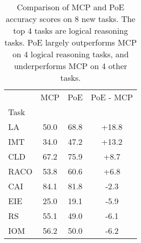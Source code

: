 \begin{table}[h]
\centering
\caption{Comparison of MCP and PoE accuracy scores on 8 new tasks. The top 4 tasks are logical reasoning tasks. PoE largely outperforms MCP on 4 logical reasoning tasks, and underperforms MCP on 4 other tasks.}
\label{tab:logical_reasoning}
\begin{tabular}{l|c|c|c}
 & MCP & PoE & PoE - MCP \\
Task &  &  &  \\
LA & 50.0 & 68.8 & +18.8 \\
IMT & 34.0 & 47.2 & +13.2 \\
CLD & 67.2 & 75.9 & +8.7 \\
RACO & 53.8 & 60.6 & +6.8 \\
CAI & 84.1 & 81.8 & -2.3 \\
EIE & 25.0 & 19.1 & -5.9 \\
RS & 55.1 & 49.0 & -6.1 \\
IOM & 56.2 & 50.0 & -6.2 \\
\end{tabular}
\end{table}
